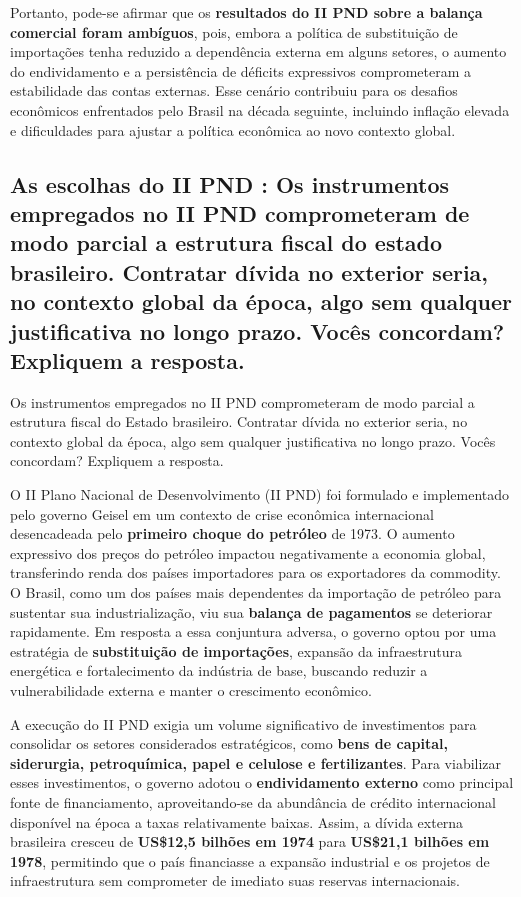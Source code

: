 \documentclass[a4paper,12pt]{article}[abntex2]
\begin{document}
Portanto, pode-se afirmar que os \textbf{resultados do II PND sobre a balança comercial foram ambíguos}, pois, embora a política de substituição de importações tenha reduzido a dependência externa em alguns setores, o aumento do endividamento e a persistência de déficits expressivos comprometeram a estabilidade das contas externas. Esse cenário contribuiu para os desafios econômicos enfrentados pelo Brasil na década seguinte, incluindo inflação elevada e dificuldades para ajustar a política econômica ao novo contexto global.

\subsection{\textbf{As escolhas do II PND : Os instrumentos empregados no II PND comprometeram de modo parcial a estrutura fiscal do estado brasileiro. Contratar dívida no exterior seria, no contexto global da época, algo sem qualquer justificativa no longo prazo. Vocês concordam? Expliquem a resposta.}}

Os instrumentos empregados no II PND comprometeram de modo parcial a estrutura fiscal do Estado brasileiro. Contratar dívida no exterior seria, no contexto global da época, algo sem qualquer justificativa no longo prazo. Vocês concordam? Expliquem a resposta.

O II Plano Nacional de Desenvolvimento (II PND) foi formulado e implementado pelo governo Geisel em um contexto de crise econômica internacional desencadeada pelo \textbf{primeiro choque do petróleo} de 1973. O aumento expressivo dos preços do petróleo impactou negativamente a economia global, transferindo renda dos países importadores para os exportadores da commodity. O Brasil, como um dos países mais dependentes da importação de petróleo para sustentar sua industrialização, viu sua \textbf{balança de pagamentos} se deteriorar rapidamente. Em resposta a essa conjuntura adversa, o governo optou por uma estratégia de \textbf{substituição de importações}, expansão da infraestrutura energética e fortalecimento da indústria de base, buscando reduzir a vulnerabilidade externa e manter o crescimento econômico.

A execução do II PND exigia um volume significativo de investimentos para consolidar os setores considerados estratégicos, como \textbf{bens de capital, siderurgia, petroquímica, papel e celulose e fertilizantes}. Para viabilizar esses investimentos, o governo adotou o \textbf{endividamento externo} como principal fonte de financiamento, aproveitando-se da abundância de crédito internacional disponível na época a taxas relativamente baixas. Assim, a dívida externa brasileira cresceu de \textbf{US\$12,5 bilhões em 1974} para \textbf{US\$21,1 bilhões em 1978}, permitindo que o país financiasse a expansão industrial e os projetos de infraestrutura sem comprometer de imediato suas reservas internacionais.
\end{document}
